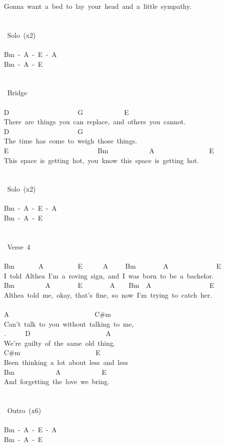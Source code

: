 {Gonna\ want\ a\ bed\ to\ lay\ your\ head\ and\ a\ little\ sympathy.\\
\\
\\
\lbrack\ Solo\rbrack\ (x2)\\
\\
Bm\ -\ A\ -\ E\ -\ A\\
Bm\ -\ A\ -\ E\\
\\
\\
\lbrack\ Bridge\rbrack\\
\\
D\ \ \ \ \ \ \ \ \ \ \ \ \ \ \ \ \ \ \ \ G\ \ \ \ \ \ \ \ \ \ \ \ E\\
There\ are\ things\ you\ can\ replace,\ and\ others\ you\ cannot.\\
D\ \ \ \ \ \ \ \ \ \ \ \ \ \ \ \ \ \ \ \ G\\
The\ time\ has\ come\ to\ weigh\ those\ things.\\
E\ \ \ \ \ \ \ \ \ \ \ \ \ \ \ \ \ \ \ \ \ \ \ \ \ \ Bm\ \ \ \ \ \ \ \ \ \ \ \ A\ \ \ \ \ \ \ \ \ \ \ \ \ \ \ \ E\\
This\ space\ is\ getting\ hot,\ you\ know\ this\ space\ is\ getting\ hot.\\
\\
\\
\lbrack\ Solo\rbrack\ (x2)\\
\\
Bm\ -\ A\ -\ E\ -\ A\\
Bm\ -\ A\ -\ E\\
\\
\\
\lbrack\ Verse\ 4\rbrack\\
\\
Bm\ \ \ \ \ \ \ A\ \ \ \ \ \ \ \ \ \ E\ \ \ \ \ \ A\ \ \ \ \ Bm\ \ \ \ \ \ \ \ A\ \ \ \ \ \ \ \ \ \ \ \ \ \ E\\
I\ told\ Althea\ I'm\ a\ roving\ sign,\ and\ I\ was\ born\ to\ be\ a\ bachelor.\\
Bm\ \ \ \ \ \ \ \ \ A\ \ \ \ \ \ \ \ E\ \ \ \ \ \ \ \ A\ \ \ \ Bm\ \ A\ \ \ \ \ \ \ \ \ \ \ \ \ \ \ \ \ E\\
Althea\ told\ me,\ okay,\ that's\ fine,\ so\ now\ I'm\ trying\ to\ catch\ her.\\
\\
A\ \ \ \ \ \ \ \ \ \ \ \ \ \ \ \ \ \ \ \ \ \ \ \ \ C\#m\\
Can't\ talk\ to\ you\ without\ talking\ to\ me,\\
. \ \ \ \ \ D\ \ \ \ \ \ \ \ \ \ \ \ \ \ \ \ \ \ \ \ \ \ A\\
We're\ guilty\ of\ the\ same\ old\ thing.\\
C\#m\ \ \ \ \ \ \ \ \ \ \ \ \ \ \ \ \ \ \ \ \ \ E\\
Been\ thinking\ a\ lot\ about\ less\ and\ less\\
Bm\ \ \ \ \ \ \ \ \ \ \ \ A\ \ \ \ \ \ \ \ \ \ \ \ E\\
And\ forgetting\ the\ love\ we\ bring.\\
\\
\\
\lbrack\ Outro\rbrack\ (x6)\\
\\
Bm\ -\ A\ -\ E\ -\ A\\
Bm\ -\ A\ -\ E}
